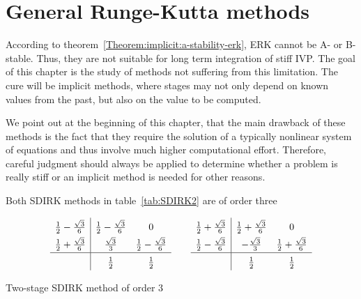 \section{General Runge-Kutta methods}

\begin{intro}
  According to theorem~\ref{Theorem:implicit:a-stability-erk}, ERK
  cannot be A- or B-stable. Thus, they are not suitable for long term
  integration of stiff IVP. The goal of this chapter is the study of
  methods not suffering from this limitation. The cure will be
  implicit methods, where stages may not only depend on
  known values from the past, but also on the value to be computed.
  
  We point out at the beginning of this chapter, that the main
  drawback of these methods is the fact that they require the solution
  of a typically nonlinear system of equations and thus involve much
  higher computational effort. Therefore, careful judgment should
  always be applied to determine whether a problem is really stiff or
  an implicit method is needed for other reasons.
\end{intro}




\begin{example}
  Both SDIRK methods in table~\ref{tab:SDIRK2} are of 
  order three
  \begin{table}[htp]
    \centering
  \begin{gather}
    \def\arraystretch{1.5}
    \begin{array}{c|cc}
      \frac12 - \frac{\sqrt{3}}{6} & \frac12 - \frac{\sqrt{3}}{6} & 0 \\
      \frac12 + \frac{\sqrt{3}}{6} & \frac{\sqrt{3}}{3} & \frac12 - \frac{\sqrt{3}}{6} \\
      \hline
      & \frac12 & \frac12
    \end{array}
    \qquad
    \begin{array}{c|cc}
      \frac12 + \frac{\sqrt{3}}{6} & \frac12 + \frac{\sqrt{3}}{6} & 0 \\
      \frac12 - \frac{\sqrt{3}}{6} & -\frac{\sqrt{3}}{3} & \frac12 + \frac{\sqrt{3}}{6} \\
      \hline
      & \frac12 & \frac12
    \end{array}
  \end{gather}
    \caption{Two-stage SDIRK method of order 3}
    \label{tab:SDIRK2}
  \end{table}
\end{example}

